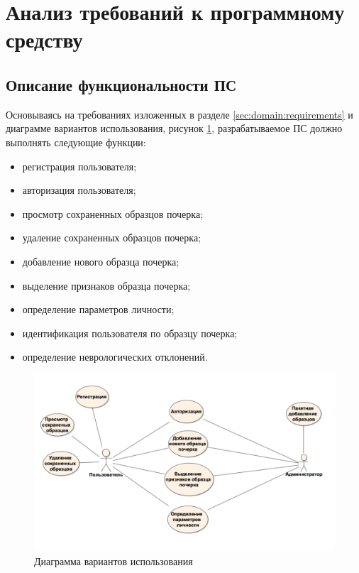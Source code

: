 \section{Анализ требований к программному средству}
\label{sec:freq}
\subsection{Описание функциональности ПС}
Основываясь на требованиях изложенных в разделе \ref{sec:domain:requirements} и диаграмме вариантов использования, рисунок \ref{fig:freg:usecase}, разрабатываемое ПС должно выполнять следующие функции:

\begin{itemize}
	\item регистрация пользователя;
	\item авторизация пользователя;
	\item просмотр сохраненных образцов почерка;
	\item удаление сохраненных образцов почерка;
	\item добавление нового образца почерка;
	\item выделение признаков образца почерка;
	\item определение параметров личности;
	\item идентификация пользователя по образцу почерка;
	\item определение неврологических отклонений.
\end{itemize}

\begin{figure}[ht]
\centering
    \includegraphics[scale=0.4]{figures/use_case.png}  
    \caption{Диаграмма вариантов использования}
  \label{fig:freg:usecase}
\end{figure}

